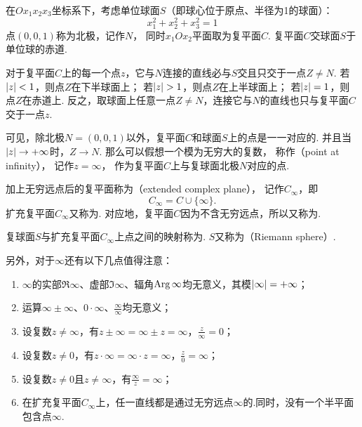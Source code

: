 \begin{definition}%
在\(Ox_1x_2x_3\)坐标系下，考虑单位球面\(S\)（即球心位于原点、半径为1的球面）：\begin{equation*}
	x_1^2+x_2^2+x_3^2=1
\end{equation*}
点\((0,0,1)\)称为北极，记作\(N\)，
同时\(x_1Ox_2\)平面取为复平面\(C\).
复平面\(C\)交球面\(S\)于单位球的赤道.

对于复平面\(C\)上的每一个点\(z\)，它与\(N\)连接的直线必与\(S\)交且只交于一点\(Z \neq N\).
若\(\abs{z} < 1\)，则点\(Z\)在下半球面上；
若\(\abs{z} > 1\)，则点\(Z\)在上半球面上；
若\(\abs{z} = 1\)，则点\(Z\)在赤道上.
反之，取球面上任意一点\(Z \neq N\)，连接它与\(N\)的直线也只与复平面\(C\)交于一点\(z\).

可见，除北极\(N=(0,0,1)\)以外，复平面\(C\)和球面\(S\)上的点是一一对应的.
并且当\(\abs{z} \to +\infty\)时，\(Z \to N\).
那么可以假想一个模为无穷大的复数，
称作（point at infinity），
记作\(z = \infty\)，
作为复平面\(C\)上与复球面北极\(N\)对应的点.

加上无穷远点后的复平面称为（extended complex plane），
记作\(C_\infty\)，即\begin{equation*}
C_\infty = C \cup \{\infty\}.
\end{equation*}
扩充复平面\(C_\infty\)又称为.
对应地，复平面\(C\)因为不含无穷远点，所以又称为.

复球面\(S\)与扩充复平面\(C_\infty\)上点之间的映射称为.
\(S\)又称为（Riemann sphere）.

另外，对于\(\infty\)还有以下几点值得注意：
\begin{enumerate}
	\item \(\infty\)的实部\(\Re\infty\)、虚部\(\Im\infty\)、辐角\(\operatorname{Arg}\infty\)均无意义，其模\(\abs{\infty}=+\infty\)；
	\item 运算\(\infty \pm \infty\)、\(0 \cdot \infty\)、\(\frac{\infty}{\infty}\)均无意义；
	\item 设复数\(z \neq \infty\)，有\(z \pm \infty = \infty \pm z = \infty\)，\(\frac{z}{\infty} = 0\)；
	\item 设复数\(z \neq 0\)，有\(z \cdot \infty = \infty \cdot z = \infty\)，\(\frac{z}{0} = \infty\)；
	\item 设复数\(z \neq 0\)且\(z \neq \infty\)，有\(\frac{\infty}{z} = \infty\)；
	\item 在扩充复平面\(C_\infty\)上，任一直线都是通过无穷远点\(\infty\)的.同时，没有一个半平面包含点\(\infty\).
\end{enumerate}
\end{definition}

